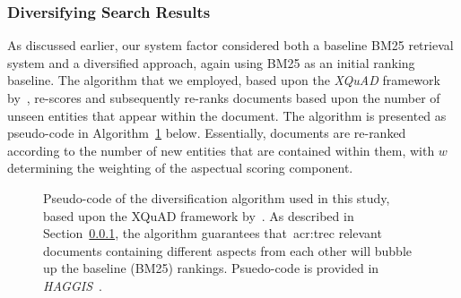 \subsubsection{Diversifying Search Results}\label{sec:diversity:users:diversifying}
As discussed earlier, our system factor considered both a baseline BM25 retrieval system and a diversified approach, again using BM25 as an initial ranking baseline. The algorithm that we employed, based upon the \emph{XQuAD} framework by~\cite{santos2010query_reformulations_diversification}, re-scores and subsequently re-ranks documents based upon the number of unseen entities that appear within the document. The algorithm is presented as pseudo-code in Algorithm~\ref{alg:diversifying} below. Essentially, documents are re-ranked according to the number of new entities that are contained within them, with $w$ determining the weighting of the aspectual scoring component.

\renewcommand{\figurename}{Figure/Algorithm}
\begin{figure}[p!]
    \centering
    \caption[Diversification algorithm pseudo-code]{Pseudo-code of the diversification algorithm used in this study, based upon the XQuAD framework by~\cite{santos2010query_reformulations_diversification}. As described in Section~\ref{sec:diversity:users:diversifying}, the algorithm guarantees that~\gls{acr:trec} relevant documents containing different aspects from each other will bubble up the baseline (BM25) rankings. Psuedo-code is provided in \emph{HAGGIS}~\citep{cutts2014haggis}.}
    \label{alg:diversifying}
\end{figure}
\renewcommand{\figurename}{Figure}

